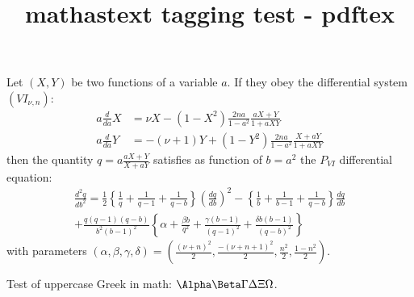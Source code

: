 \documentclass{article}
\title{mathastext tagging test - pdftex}
\begin{document}
Let $(X,Y)$ be two functions of a variable $a$. If they obey  the differential
system  $(VI_{\nu,n})$: 
\begin{align*}
a\frac{d}{da} X &= \nu
X - (1 - X^2)\frac{2n a}{1 - a^2}\frac{aX+Y}{1+a XY} \\  
a\frac{d}{da} Y &= -(\nu+1) Y
+ (1 - Y^2)\frac{2n a}{1 - a^2}\frac{X+aY}{1+a XY} 
\end{align*}
then the quantity $q = a \frac{aX+Y}{X+aY}$
satisfies as function of $b= a^2$  the $P_{VI}$ differential equation:
\begin{equation*}
\begin{split}
\frac{d^2 q}{db^2} = \frac12\left\{\frac1q+\frac1{q-1}
+\frac1{q-b}\right\}\left(\frac{dq}{db}\right)^2 - \left\{\frac1b+\frac1{b-1}
+\frac1{q-b}\right\}\frac{dq}{db}\\+\frac{q(q-1)(q-b)}{b^2(b-1)^2}\left\{\alpha+\frac{\beta
b}{q^2} + \frac{\gamma (b-1)}{(q-1)^2}+\frac{\delta
b(b-1)}{(q-b)^2}\right\}
\end{split}
\end{equation*}
with
parameters
$(\alpha,\beta,\gamma,\delta) = (\frac{(\nu+n)^2}2,
\frac{-(\nu+n+1)^2}2, \frac{n^2}2, \frac{1 - n^2}2)$.

Test of uppercase Greek in math: $\Alpha\Beta\Gamma\Delta\Xi\Omega$.
\end{document}
